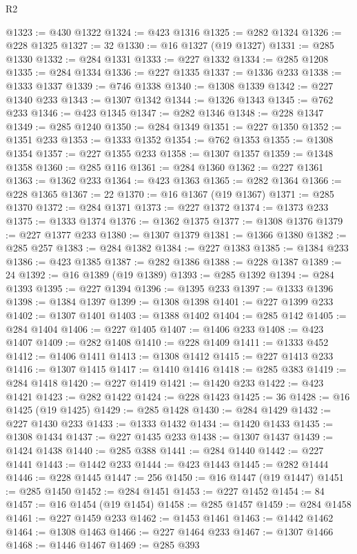 \begin{lexlean}{R2}
\begin{coremodule}
@1323 := @430 @1322
@1324 := @423 @1316
@1325 := @282 @1324
@1326 := @228 @1325
@1327 := 32
@1330 := @16 @1327 (@19 @1327)
@1331 := @285 @1330
@1332 := @284 @1331
@1333 := @227 @1332
@1334 := @285 @1208
@1335 := @284 @1334
@1336 := @227 @1335
@1337 := @1336 @233
@1338 := @1333 @1337
@1339 := @746 @1338
@1340 := @1308 @1339
@1342 := @227 @1340 @233
@1343 := @1307 @1342
@1344 := @1326 @1343
@1345 := @762 @233
@1346 := @423 @1345
@1347 := @282 @1346
@1348 := @228 @1347
@1349 := @285 @1240
@1350 := @284 @1349
@1351 := @227 @1350
@1352 := @1351 @233
@1353 := @1333 @1352
@1354 := @762 @1353
@1355 := @1308 @1354
@1357 := @227 @1355 @233
@1358 := @1307 @1357
@1359 := @1348 @1358
@1360 := @285 @116
@1361 := @284 @1360
@1362 := @227 @1361
@1363 := @1362 @233
@1364 := @423 @1363
@1365 := @282 @1364
@1366 := @228 @1365
@1367 := 22
@1370 := @16 @1367 (@19 @1367)
@1371 := @285 @1370
@1372 := @284 @1371
@1373 := @227 @1372
@1374 := @1373 @233
@1375 := @1333 @1374
@1376 := @1362 @1375
@1377 := @1308 @1376
@1379 := @227 @1377 @233
@1380 := @1307 @1379
@1381 := @1366 @1380
@1382 := @285 @257
@1383 := @284 @1382
@1384 := @227 @1383
@1385 := @1384 @233
@1386 := @423 @1385
@1387 := @282 @1386
@1388 := @228 @1387
@1389 := 24
@1392 := @16 @1389 (@19 @1389)
@1393 := @285 @1392
@1394 := @284 @1393
@1395 := @227 @1394
@1396 := @1395 @233
@1397 := @1333 @1396
@1398 := @1384 @1397
@1399 := @1308 @1398
@1401 := @227 @1399 @233
@1402 := @1307 @1401
@1403 := @1388 @1402
@1404 := @285 @142
@1405 := @284 @1404
@1406 := @227 @1405
@1407 := @1406 @233
@1408 := @423 @1407
@1409 := @282 @1408
@1410 := @228 @1409
@1411 := @1333 @452
@1412 := @1406 @1411
@1413 := @1308 @1412
@1415 := @227 @1413 @233
@1416 := @1307 @1415
@1417 := @1410 @1416
@1418 := @285 @383
@1419 := @284 @1418
@1420 := @227 @1419
@1421 := @1420 @233
@1422 := @423 @1421
@1423 := @282 @1422
@1424 := @228 @1423
@1425 := 36
@1428 := @16 @1425 (@19 @1425)
@1429 := @285 @1428
@1430 := @284 @1429
@1432 := @227 @1430 @233
@1433 := @1333 @1432
@1434 := @1420 @1433
@1435 := @1308 @1434
@1437 := @227 @1435 @233
@1438 := @1307 @1437
@1439 := @1424 @1438
@1440 := @285 @388
@1441 := @284 @1440
@1442 := @227 @1441
@1443 := @1442 @233
@1444 := @423 @1443
@1445 := @282 @1444
@1446 := @228 @1445
@1447 := 256
@1450 := @16 @1447 (@19 @1447)
@1451 := @285 @1450
@1452 := @284 @1451
@1453 := @227 @1452
@1454 := 84
@1457 := @16 @1454 (@19 @1454)
@1458 := @285 @1457
@1459 := @284 @1458
@1461 := @227 @1459 @233
@1462 := @1453 @1461
@1463 := @1442 @1462
@1464 := @1308 @1463
@1466 := @227 @1464 @233
@1467 := @1307 @1466
@1468 := @1446 @1467
@1469 := @285 @393

\end{coremodule}
\end{lexlean}
